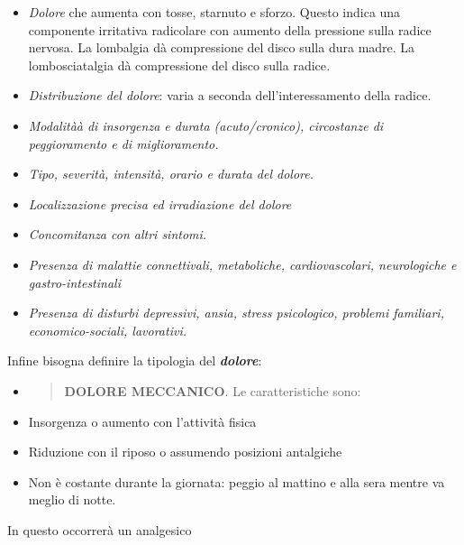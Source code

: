 \documentclass[]{article}
\begin{document}
\begin{itemize}
\item
  \emph{\emph{Dolore}} che aumenta con tosse, starnuto e sforzo. Questo
  indica una componente irritativa radicolare con aumento della
  pressione sulla radice nervosa. La lombalgia dà compressione del disco
  sulla dura madre. La lombosciatalgia dà compressione del disco sulla
  radice\emph{. }
\item
  \emph{\emph{Distribuzione del dolore}}: varia a seconda
  dell'interessamento della radice.
\item
  \emph{Modalitàà di insorgenza e durata (acuto/cronico), circostanze di
  peggioramento e di miglioramento. }
\end{itemize}

\begin{itemize}
\item
  \emph{Tipo, severità, intensità, orario e durata del dolore. }
\item
  \emph{Localizzazione precisa ed irradiazione del dolore}
\item
  \emph{Concomitanza con altri sintomi. }
\item
  \emph{Presenza di malattie connettivali, metaboliche, cardiovascolari,
  neurologiche e gastro-intestinali}
\item
  \emph{Presenza di disturbi depressivi, ansia, stress psicologico,
  problemi familiari, economico-sociali, lavorativi.}
\end{itemize}

Infine bisogna definire la tipologia del \textbf{\emph{dolore}}:

\begin{itemize}
\item
  \begin{quote}
  \textbf{DOLORE MECCANICO}. Le caratteristiche sono:
  \end{quote}
\end{itemize}

\begin{itemize}
\item
  Insorgenza o aumento con l'attività fisica
\item
  Riduzione con il riposo o assumendo posizioni antalgiche
\item
  Non è costante durante la giornata: peggio al mattino e alla sera
  mentre va meglio di notte.
\end{itemize}

In questo occorrerà un analgesico
\end{document}
